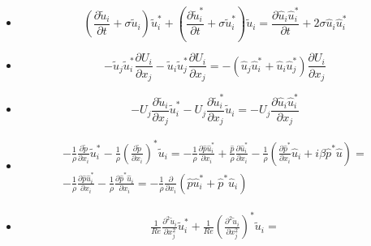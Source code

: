 \documentclass{jfm}
\begin{document}
\begin{itemize}
  \item
  \begin{equation}
    \left( \frac{\partial \tilde{u}_i}{\partial t} + \sigma \tilde{u}_i \right) \tilde{u}_i^* +
    \left( \frac{\partial \tilde{u}_i^*}{\partial t} + \sigma \tilde{u}^*_i \right) \tilde{u}_i = 
    \frac{\partial \hat{u}_i \hat{u}^*_i}{\partial t} + 2 \sigma \hat{u}_i \hat{u}_i^*
  \end{equation}
  \item
  \begin{equation}
    - \tilde{u}_j \tilde{u}_i^* \frac{\partial U_i}{\partial x_j} - 
      \tilde{u}_i \tilde{u}_j^* \frac{\partial U_i}{\partial x_j} = - ( \hat{u}_j \hat{u}_i^* + \hat{u}_i \hat{u}_j^* ) \frac{\partial U_i}{\partial x_j}
  \end{equation}
  \item
  \begin{equation}
    - U_j \frac{\partial \tilde{u}_i}{\partial x_j} \tilde{u}_i^* - U_j \frac{\partial \tilde{u}_i^*}{\partial x_j} \tilde{u}_i = 
    - U_j \frac{\partial \hat{u}_i \hat{u}_i^*}{\partial x_j}
  \end{equation}
  \item
  \begin{equation}
  \begin{gathered}
    - \frac{1}{\rho} \frac{\partial \tilde{p}}{\partial x_i} \tilde{u}_i^* - 
      \frac{1}{\rho} \left( \frac{\partial \tilde{p}}{\partial x_i} \right)^* \tilde{u}_i = 
    - \frac{1}{\rho} \frac{\partial \hat{p} \hat{u}_i^*}{\partial x_i} + \frac{\hat{p}}{\rho} \frac{\partial \hat{u}_i^*}{\partial x_i} - 
    \frac{1}{\rho} \left( \frac{\partial \hat{p}^*}{\partial x_i} \hat{u}_i + i \beta \hat{p}^* \hat{u} \right) = \\
    - \frac{1}{\rho} \frac{\partial \hat{p} \hat{u}_i^*}{\partial x_i} -
      \frac{1}{\rho} \frac{\partial \hat{p}^* \hat{u}_i}{\partial x_i} = 
      - \frac{1}{\rho} \frac{\partial}{\partial x_i} \left(  \hat{p} \hat{u}_i^* + \hat{p}^* \hat{u}_i \right)
  \end{gathered}
  \end{equation}
  \item 
  \begin{equation}
  \begin{gathered}
    \frac{1}{Re} \frac{\partial^2 \tilde{u}_i}{\partial x_j^2} \tilde{u}_i^* +
    \frac{1}{Re} \left( \frac{\partial^2 \tilde{u}_i}{\partial x_j^2} \right)^* \tilde{u}_i = \\

\end{gathered}
\end{equation}
\end{itemize}
\end{document}
